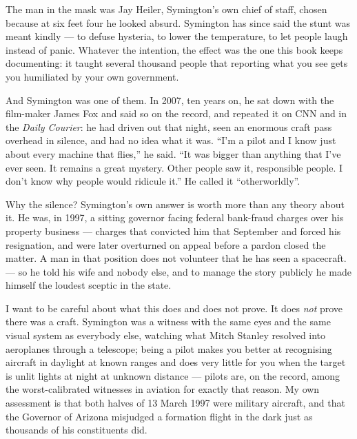The man in the mask was Jay Heiler, Symington's own chief of staff, chosen because at six feet
four he looked absurd. Symington has since said the stunt was meant kindly --- to defuse
hysteria, to lower the temperature, to let people laugh instead of panic. Whatever the
intention, the effect was the one this book keeps documenting: it taught several thousand people
that reporting what you see gets you humiliated by your own government.

And Symington was one of them. In 2007, ten years on, he sat down with the film-maker James Fox
and said so on the record, and repeated it on CNN and in the \emph{Daily Courier}: he had driven
out that night, seen an enormous craft pass overhead in silence, and had no idea what it was.
``I'm a pilot and I know just about every machine that flies,'' he said. ``It was bigger than
anything that I've ever seen. It remains a great mystery. Other people saw it, responsible
people. I don't know why people would ridicule it.'' He called it ``otherworldly''.


Why the silence? Symington's own answer is worth more than any theory about it. He was, in 1997,
a sitting governor facing federal bank-fraud charges over his property business --- charges that
convicted him that September and forced his resignation, and were later overturned on appeal
before a pardon closed the matter. A man in that position does not volunteer that he has seen a
spacecraft.  --- so he
told his wife and nobody else, and to manage the story publicly he made himself the loudest
sceptic in the state.

I want to be careful about what this does and does not prove. It does \emph{not} prove there was
a craft. Symington was a witness with the same eyes and the same visual system as everybody
else, watching what Mitch Stanley resolved into aeroplanes through a telescope; being a pilot
makes you better at recognising aircraft in daylight at known ranges and does very little for
you when the target is unlit lights at night at unknown distance --- pilots are, on the record,
among the worst-calibrated witnesses in aviation for exactly that reason. My own assessment is
that both halves of 13 March 1997 were military aircraft, and that the Governor of Arizona
misjudged a formation flight in the dark just as thousands of his constituents did.

